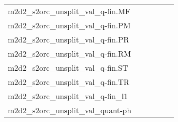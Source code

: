 {\begin{longtable}{m{6cm}m{1.7cm}m{1.7cm}m{1.7cm}m{1.7cm}m{1.7cm}}
	m2d2\_s2orc\_unsplit\_val\_q-fin.MF  & \colorbox[HTML]{7dc87b}{\makebox[\mywidth][c]{9.91}} & \colorbox[HTML]{e1f3a9}{\makebox[\mywidth][c]{10.21}} & \colorbox[HTML]{ffffe5}{\makebox[\mywidth][c]{11.92}} & \colorbox[HTML]{b7e193}{\makebox[\mywidth][c]{10.04}} & \colorbox[HTML]{77c578}{\makebox[\mywidth][c]{9.90}}\\
	m2d2\_s2orc\_unsplit\_val\_q-fin.PM  & \colorbox[HTML]{91d183}{\makebox[\mywidth][c]{11.00}} & \colorbox[HTML]{e5f4ab}{\makebox[\mywidth][c]{11.31}} & \colorbox[HTML]{ffffe5}{\makebox[\mywidth][c]{13.14}} & \colorbox[HTML]{c2e698}{\makebox[\mywidth][c]{11.14}} & \colorbox[HTML]{77c578}{\makebox[\mywidth][c]{10.94}}\\
	m2d2\_s2orc\_unsplit\_val\_q-fin.PR  & \colorbox[HTML]{ffffe5}{\makebox[\mywidth][c]{15.87}} & \colorbox[HTML]{98d485}{\makebox[\mywidth][c]{9.25}} & \colorbox[HTML]{ecf7b1}{\makebox[\mywidth][c]{10.37}} & \colorbox[HTML]{90d082}{\makebox[\mywidth][c]{9.20}} & \colorbox[HTML]{77c578}{\makebox[\mywidth][c]{9.03}}\\
	m2d2\_s2orc\_unsplit\_val\_q-fin.RM  & \colorbox[HTML]{b6e092}{\makebox[\mywidth][c]{11.35}} & \colorbox[HTML]{def2a6}{\makebox[\mywidth][c]{11.49}} & \colorbox[HTML]{ffffe5}{\makebox[\mywidth][c]{13.08}} & \colorbox[HTML]{cae99c}{\makebox[\mywidth][c]{11.41}} & \colorbox[HTML]{77c578}{\makebox[\mywidth][c]{11.22}}\\
	m2d2\_s2orc\_unsplit\_val\_q-fin.ST  & \colorbox[HTML]{c3e698}{\makebox[\mywidth][c]{12.43}} & \colorbox[HTML]{cae99c}{\makebox[\mywidth][c]{12.46}} & \colorbox[HTML]{ffffe5}{\makebox[\mywidth][c]{14.18}} & \colorbox[HTML]{c2e698}{\makebox[\mywidth][c]{12.43}} & \colorbox[HTML]{77c578}{\makebox[\mywidth][c]{12.26}}\\
	m2d2\_s2orc\_unsplit\_val\_q-fin.TR  & \colorbox[HTML]{8ccf81}{\makebox[\mywidth][c]{12.79}} & \colorbox[HTML]{e2f3a9}{\makebox[\mywidth][c]{13.14}} & \colorbox[HTML]{ffffe5}{\makebox[\mywidth][c]{15.32}} & \colorbox[HTML]{afdd8f}{\makebox[\mywidth][c]{12.89}} & \colorbox[HTML]{77c578}{\makebox[\mywidth][c]{12.74}}\\
	m2d2\_s2orc\_unsplit\_val\_q-fin\_l1  & \colorbox[HTML]{bfe596}{\makebox[\mywidth][c]{13.79}} & \colorbox[HTML]{ddf1a6}{\makebox[\mywidth][c]{13.91}} & \colorbox[HTML]{ffffe5}{\makebox[\mywidth][c]{15.73}} & \colorbox[HTML]{cdeb9d}{\makebox[\mywidth][c]{13.83}} & \colorbox[HTML]{77c578}{\makebox[\mywidth][c]{13.61}}\\
	m2d2\_s2orc\_unsplit\_val\_quant-ph  & \colorbox[HTML]{98d485}{\makebox[\mywidth][c]{11.18}} & \colorbox[HTML]{e2f3a9}{\makebox[\mywidth][c]{11.44}} & \colorbox[HTML]{ffffe5}{\makebox[\mywidth][c]{13.18}} & \colorbox[HTML]{cae99c}{\makebox[\mywidth][c]{11.32}} & \colorbox[HTML]{77c578}{\makebox[\mywidth][c]{11.11}}\\

\end{longtable}}
